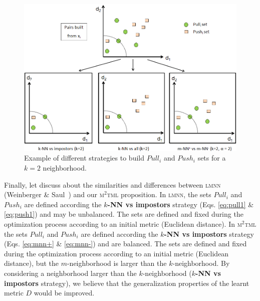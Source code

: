 \begin{figure}[h!]
	\centering
	\includegraphics[width=0.9\linewidth]{images/Strategy_neighborhood}
	\caption{Example of different strategies to build $Pull_i$ and $Push_i$ sets for a $k=2$ neighborhood.}
	\label{fig:Strategy_neighborhood}
\end{figure}

Finally, let discuss about the similarities and differences between \textsc{lmnn} (Weinberger \& Saul~\cite{Weinberger2009}) and our \textsc{m$^2$tml} proposition. In \textsc{lmnn}, the sets $Pull_i$ and $Push_i$ are defined according the \textbf{$k$-NN vs impostors} strategy (Eqs. \ref{eq:pull1} \& \ref{eq:push1}) and may be unbalanced. The sets are defined and fixed during the optimization process according to an initial metric (Euclidean distance). In \textsc{m$^2$tml} the sets $Pull_i$ and $Push_i$ are defined according the \textbf{$k$-NN vs impostors} strategy (Eqs. \ref{eq:mnn+} \& \ref{eq:mnn-}) and are balanced. The sets are defined and fixed during the optimization process according to an initial metric (Euclidean distance), but the $m$-neighborhood is larger than the $k$-neighborhood. By considering a neighborhood larger than the $k$-neighborhood (\textbf{$k$-NN vs impostors} strategy), we believe that the generalization properties of the learnt metric $D$ would be improved. 

